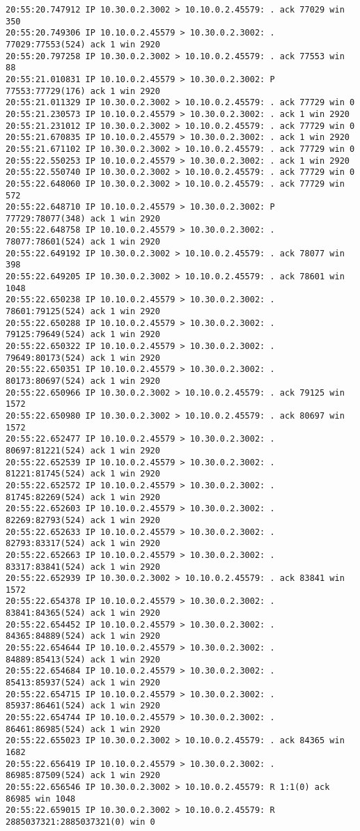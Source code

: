 \documentclass[a4paper,12pt]{article}
\begin{document}
\begin{Verbatim}
20:55:20.747912 IP 10.30.0.2.3002 > 10.10.0.2.45579: . ack 77029 win 350
20:55:20.749306 IP 10.10.0.2.45579 > 10.30.0.2.3002: . 77029:77553(524) ack 1 win 2920
20:55:20.797258 IP 10.30.0.2.3002 > 10.10.0.2.45579: . ack 77553 win 88
20:55:21.010831 IP 10.10.0.2.45579 > 10.30.0.2.3002: P 77553:77729(176) ack 1 win 2920
20:55:21.011329 IP 10.30.0.2.3002 > 10.10.0.2.45579: . ack 77729 win 0
20:55:21.230573 IP 10.10.0.2.45579 > 10.30.0.2.3002: . ack 1 win 2920
20:55:21.231012 IP 10.30.0.2.3002 > 10.10.0.2.45579: . ack 77729 win 0
20:55:21.670835 IP 10.10.0.2.45579 > 10.30.0.2.3002: . ack 1 win 2920
20:55:21.671102 IP 10.30.0.2.3002 > 10.10.0.2.45579: . ack 77729 win 0
20:55:22.550253 IP 10.10.0.2.45579 > 10.30.0.2.3002: . ack 1 win 2920
20:55:22.550740 IP 10.30.0.2.3002 > 10.10.0.2.45579: . ack 77729 win 0
20:55:22.648060 IP 10.30.0.2.3002 > 10.10.0.2.45579: . ack 77729 win 572
20:55:22.648710 IP 10.10.0.2.45579 > 10.30.0.2.3002: P 77729:78077(348) ack 1 win 2920
20:55:22.648758 IP 10.10.0.2.45579 > 10.30.0.2.3002: . 78077:78601(524) ack 1 win 2920
20:55:22.649192 IP 10.30.0.2.3002 > 10.10.0.2.45579: . ack 78077 win 398
20:55:22.649205 IP 10.30.0.2.3002 > 10.10.0.2.45579: . ack 78601 win 1048
20:55:22.650238 IP 10.10.0.2.45579 > 10.30.0.2.3002: . 78601:79125(524) ack 1 win 2920
20:55:22.650288 IP 10.10.0.2.45579 > 10.30.0.2.3002: . 79125:79649(524) ack 1 win 2920
20:55:22.650322 IP 10.10.0.2.45579 > 10.30.0.2.3002: . 79649:80173(524) ack 1 win 2920
20:55:22.650351 IP 10.10.0.2.45579 > 10.30.0.2.3002: . 80173:80697(524) ack 1 win 2920
20:55:22.650966 IP 10.30.0.2.3002 > 10.10.0.2.45579: . ack 79125 win 1572
20:55:22.650980 IP 10.30.0.2.3002 > 10.10.0.2.45579: . ack 80697 win 1572
20:55:22.652477 IP 10.10.0.2.45579 > 10.30.0.2.3002: . 80697:81221(524) ack 1 win 2920
20:55:22.652539 IP 10.10.0.2.45579 > 10.30.0.2.3002: . 81221:81745(524) ack 1 win 2920
20:55:22.652572 IP 10.10.0.2.45579 > 10.30.0.2.3002: . 81745:82269(524) ack 1 win 2920
20:55:22.652603 IP 10.10.0.2.45579 > 10.30.0.2.3002: . 82269:82793(524) ack 1 win 2920
20:55:22.652633 IP 10.10.0.2.45579 > 10.30.0.2.3002: . 82793:83317(524) ack 1 win 2920
20:55:22.652663 IP 10.10.0.2.45579 > 10.30.0.2.3002: . 83317:83841(524) ack 1 win 2920
20:55:22.652939 IP 10.30.0.2.3002 > 10.10.0.2.45579: . ack 83841 win 1572
20:55:22.654378 IP 10.10.0.2.45579 > 10.30.0.2.3002: . 83841:84365(524) ack 1 win 2920
20:55:22.654452 IP 10.10.0.2.45579 > 10.30.0.2.3002: . 84365:84889(524) ack 1 win 2920
20:55:22.654644 IP 10.10.0.2.45579 > 10.30.0.2.3002: . 84889:85413(524) ack 1 win 2920
20:55:22.654684 IP 10.10.0.2.45579 > 10.30.0.2.3002: . 85413:85937(524) ack 1 win 2920
20:55:22.654715 IP 10.10.0.2.45579 > 10.30.0.2.3002: . 85937:86461(524) ack 1 win 2920
20:55:22.654744 IP 10.10.0.2.45579 > 10.30.0.2.3002: . 86461:86985(524) ack 1 win 2920
20:55:22.655023 IP 10.30.0.2.3002 > 10.10.0.2.45579: . ack 84365 win 1682
20:55:22.656419 IP 10.10.0.2.45579 > 10.30.0.2.3002: . 86985:87509(524) ack 1 win 2920
20:55:22.656546 IP 10.30.0.2.3002 > 10.10.0.2.45579: R 1:1(0) ack 86985 win 1048
20:55:22.659015 IP 10.30.0.2.3002 > 10.10.0.2.45579: R 2885037321:2885037321(0) win 0
\end{Verbatim}
\end{document}
